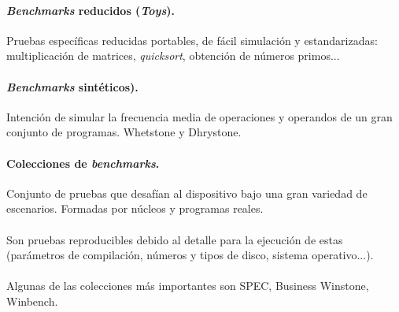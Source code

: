 \documentclass{article}
\begin{document}
\begin{multicols}{2}
		\paragraph{\textit{Benchmarks} reducidos (\textit{Toys}).}
		Pruebas específicas reducidas portables, de fácil simulación y estandarizadas: multiplicación de matrices, \textit{quicksort}, obtención de números primos...
		
		\paragraph{\textit{Benchmarks} sintéticos).}
		Intención de simular la frecuencia media de operaciones y operandos de un gran conjunto de programas. Whetstone y Dhrystone.
		
		\paragraph{Colecciones de \textit{benchmarks}.}
		 Conjunto de pruebas que desafían al dispositivo bajo una gran variedad de escenarios. Formadas por núcleos y programas reales. 
		 \paragraph{}
		 Son pruebas reproducibles debido al detalle para la ejecución de estas (parámetros de compilación, números y tipos de disco, sistema operativo...).
		 \paragraph{}
		 Algunas de las colecciones más importantes son SPEC, Business Winstone, Winbench. 
		
	\end{multicols}
	
\end{document}

